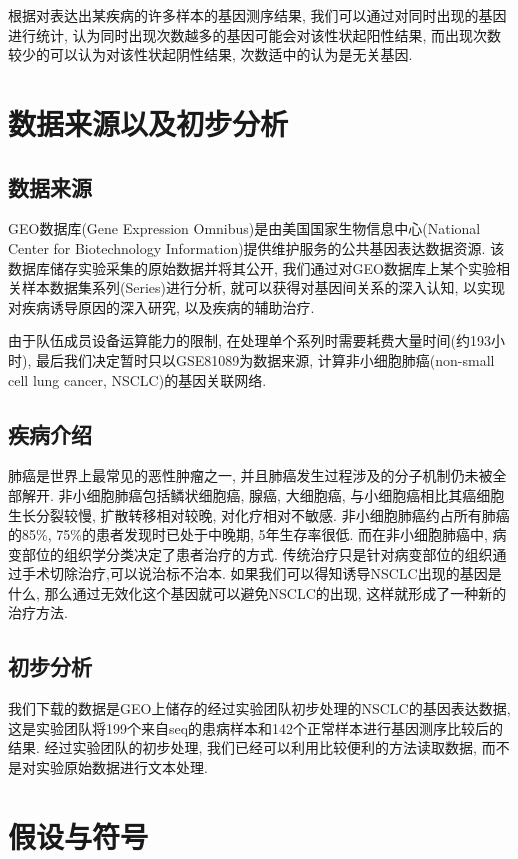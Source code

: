 \documentclass[zihao=-4]{ctexart}
\begin{document}
根据对表达出某疾病的许多样本的基因测序结果, 我们可以通过对同时出现的基因进行统计, 认为同时出现次数越多的基因可能会对该性状起阳性结果, 而出现次数较少的可以认为对该性状起阴性结果, 次数适中的认为是无关基因.


\section{数据来源以及初步分析}
\subsection{数据来源}
GEO数据库(Gene Expression Omnibus)是由美国国家生物信息中心(National Center for Biotechnology Information)提供维护服务的公共基因表达数据资源. 该数据库储存实验采集的原始数据并将其公开, 我们通过对GEO数据库上某个实验相关样本数据集系列(Series)进行分析, 就可以获得对基因间关系的深入认知, 以实现对疾病诱导原因的深入研究, 以及疾病的辅助治疗.

由于队伍成员设备运算能力的限制, 在处理单个系列时需要耗费大量时间(约193小时), 最后我们决定暂时只以GSE81089为数据来源, 计算非小细胞肺癌(non-small cell lung cancer, NSCLC)的基因关联网络.
\subsection{疾病介绍}
肺癌是世界上最常见的恶性肿瘤之一, 并且肺癌发生过程涉及的分子机制仍未被全部解开. 非小细胞肺癌\cite{wiki:NSCLC}包括鳞状细胞癌, 腺癌, 大细胞癌, 与小细胞癌相比其癌细胞生长分裂较慢, 扩散转移相对较晚, 对化疗相对不敏感. 非小细胞肺癌约占所有肺癌的85\%, 75\%的患者发现时已处于中晚期, 5年生存率很低. 而在非小细胞肺癌中, 病变部位的组织学分类决定了患者治疗的方式. 传统治疗只是针对病变部位的组织通过手术切除治疗,可以说治标不治本. 如果我们可以得知诱导NSCLC出现的基因是什么, 那么通过无效化这个基因就可以避免NSCLC的出现, 这样就形成了一种新的治疗方法.
\subsection{初步分析}
我们下载的数据是GEO上储存的经过实验团队初步处理的NSCLC的基因表达数据, 这是实验团队将199个来自seq的患病样本和142个正常样本进行基因测序比较后的结果. 经过实验团队的初步处理, 我们已经可以利用比较便利的方法读取数据, 而不是对实验原始数据进行文本处理. 

\section{假设与符号}
\end{document}
